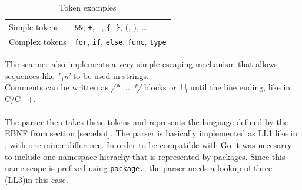 \documentclass[a4paper]{scrartcl}
\begin{document}
    \begin{table}[htb]
    \centering
    \begin{tabular}{ll}
        \toprule
        Simple tokens & \texttt{\&\&}, \texttt{+}, \texttt{-}, \texttt{\{}, \texttt{\}}, \texttt{$($}, \texttt{$)$}, \dots \\
        Complex tokens & \texttt{for}, \texttt{if}, \texttt{else}, \texttt{func}, \texttt{type} \\
        \bottomrule
    \end{tabular}
    \caption{Token examples}
    \label{tbl:tokens}
    \end{table}

    The scanner also implements a very simple escaping mechanism that allows 
    sequences like \textit{'\textbackslash n'} to be used in strings. \\
    Comments can be written as \textit{/* ... */} blocks or 
    \textit{\textbackslash \textbackslash} until the line ending, like in C/C++.
    \\ \\
    The parser then takes these tokens and represents the language defined by
    the EBNF from section \ref{sec:ebnf}. The parser is basically implemented 
    as LL1 like in \cite{wir96}, with one minor difference. In order to be 
    compatible with Go it was necesarry to include one namespace hierachy that 
    is represented by packages. Since this name scope is prefixed 
    using \texttt{package.}, the parser needs a lookup of three (LL3)in this 
    case.
\end{document}
